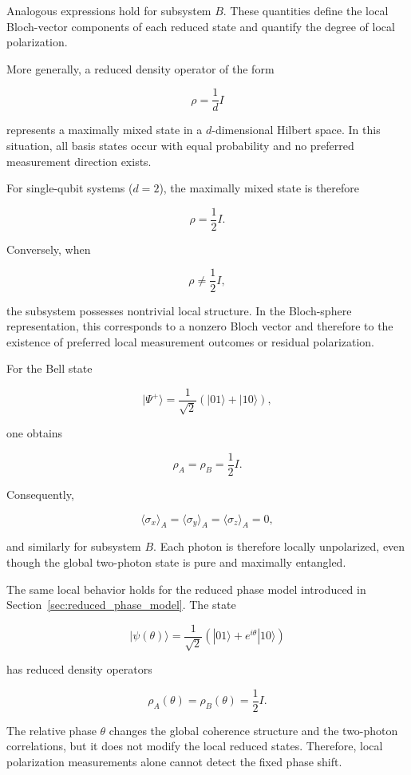 Analogous expressions hold for subsystem \( B \). These quantities define the local Bloch-vector components of each reduced state and quantify the degree of local polarization.

\medskip

More generally, a reduced density operator of the form

\[
\rho
=
\frac{1}{d}I
\]

represents a maximally mixed state in a \( d \)-dimensional Hilbert space. In this situation, all basis states occur with equal probability and no preferred measurement direction exists.

\medskip

For single-qubit systems (\( d=2 \)), the maximally mixed state is therefore

\[
\rho
=
\frac{1}{2}I.
\]

Conversely, when

\[
\rho
\neq
\frac{1}{2}I,
\]

the subsystem possesses nontrivial local structure. In the Bloch-sphere representation, this corresponds to a nonzero Bloch vector and therefore to the existence of preferred local measurement outcomes or residual polarization.

\medskip

For the Bell state

\[
|\Psi^+\rangle
=
\frac{1}{\sqrt{2}}
\left(
|01\rangle + |10\rangle
\right),
\]

one obtains

\[
\rho_A
=
\rho_B
=
\frac{1}{2}I.
\]

Consequently,

\[
\langle \sigma_x \rangle_A
=
\langle \sigma_y \rangle_A
=
\langle \sigma_z \rangle_A
=
0,
\]

and similarly for subsystem \( B \). Each photon is therefore locally unpolarized, even though the global two-photon state is pure and maximally entangled.

\medskip

The same local behavior holds for the reduced phase model introduced in Section~\ref{sec:reduced_phase_model}. The state

\[
|\psi(\theta)\rangle
=
\frac{1}{\sqrt{2}}
\left(
|01\rangle + e^{i\theta}|10\rangle
\right)
\]

has reduced density operators

\[
\rho_A(\theta)
=
\rho_B(\theta)
=
\frac{1}{2}I.
\]

The relative phase \( \theta \) changes the global coherence structure and the two-photon correlations, but it does not modify the local reduced states. Therefore, local polarization measurements alone cannot detect the fixed phase shift.

